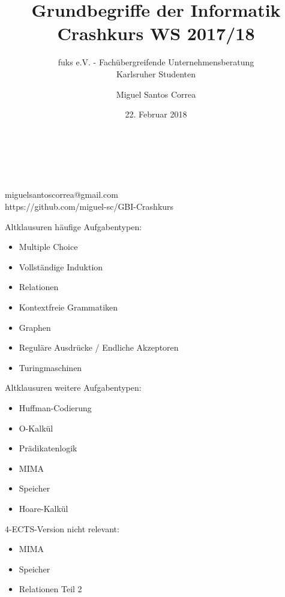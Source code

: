 \documentclass[18pt]{beamer}
\title[GBI Crashkurs]{Grundbegriffe der Informatik\\ Crashkurs WS 2017/18}
\subtitle{fuks e.V. - Fachübergreifende Unternehmensberatung\\ Karlsruher Studenten}
\author{Miguel Santos Correa}
\date{22. Februar 2018}
\begin{document}


\begin{frame}
  \begin{center}
    \huge\inserttitle\\
    \vskip 1.75mm
    \normalsize
    \insertsubtitle\\
    \vskip 1.75mm
    \insertauthor\\
    \vskip 1.75mm
    \large
    miguelsantoscorrea@gmail.com\\
    \vskip 1.75mm
    https://github.com/miguel-sc/GBI-Crashkurs
  \end{center}
\end{frame}

\begin{frame}{Altklausuren}
  häufige Aufgabentypen:
  \begin{itemize}
    \item Multiple Choice
    \item Vollständige Induktion
    \item Relationen
    \item Kontextfreie Grammatiken
    \item Graphen
    \item Reguläre Ausdrücke / Endliche Akzeptoren
    \item Turingmaschinen
  \end{itemize}
\end{frame}

\begin{frame}{Altklausuren}
  weitere Aufgabentypen:
  \begin{itemize}
    \item Huffman-Codierung
    \item O-Kalkül
    \item Prädikatenlogik
    \item MIMA
    \item Speicher
    \item Hoare-Kalkül
  \end{itemize}
\end{frame}

\begin{frame}{4-ECTS-Version}
  nicht relevant:
  \begin{itemize}
    \item MIMA
    \item Speicher
    \item Relationen Teil 2
  \end{itemize}
\end{frame}
\end{document}
